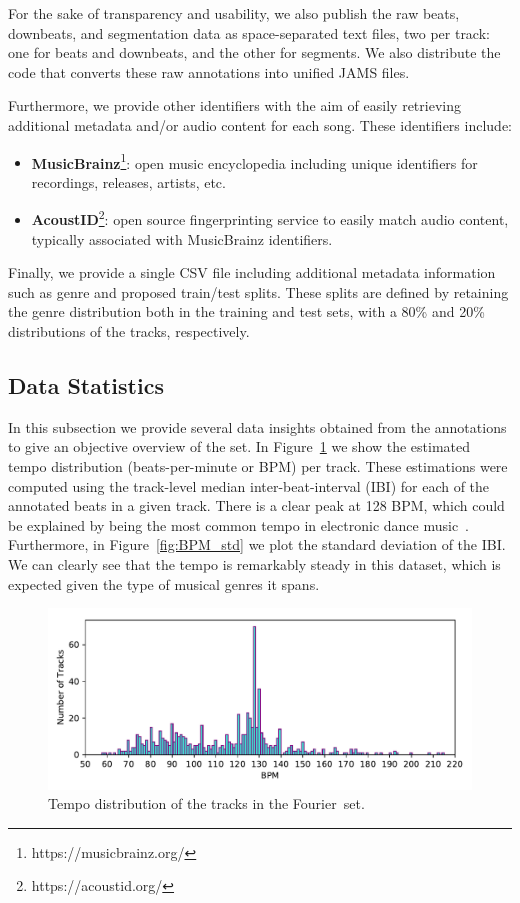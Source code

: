 \documentclass{article}
\newcommand{\setName}{Fourier}
\begin{document}
For the sake of transparency and usability, we also publish the raw beats, downbeats, and segmentation data as space-separated text files, two per track: one for beats and downbeats, and the other for segments.
We also distribute the code that converts these raw annotations into unified JAMS files.

Furthermore, we provide other identifiers with the aim of easily retrieving additional metadata and/or audio content for each song.
These identifiers include:

\begin{itemize}
    \item \textbf{MusicBrainz}\footnote{https://musicbrainz.org/}: open music encyclopedia including unique identifiers for recordings, releases, artists, etc. 
    \item \textbf{AcoustID}\footnote{https://acoustid.org/}: open source fingerprinting service to easily match audio content, typically associated with MusicBrainz identifiers.
\end{itemize}

Finally, we provide a single CSV file including additional metadata information such as genre and proposed train/test splits.
These splits are defined by retaining the genre distribution both in the training and test sets, with a 80\% and 20\% distributions of the tracks, respectively.

\subsection{Data Statistics}

In this subsection we provide several data insights obtained from the annotations to give an objective overview of the set.
In Figure~\ref{fig:BPM_dist} we show the estimated tempo distribution (beats-per-minute or BPM) per track.
These estimations were computed using the track-level median inter-beat-interval (IBI) for each of the annotated beats in a given track.
There is a clear peak at 128 BPM, which could be explained by being the most common tempo in electronic dance music~\cite{Moelants2008}.
Furthermore, in Figure~\ref{fig:BPM_std} we plot the standard deviation of the IBI.
We can clearly see that the tempo is remarkably steady in this dataset, which is expected given the type of musical genres it spans.

\begin{figure}
    \centerline{\includegraphics[width=1.05\columnwidth]{figs/BPM_distribution.pdf}}
    \caption{Tempo distribution of the tracks in the \setName~set.}
    \label{fig:BPM_dist}
\end{figure}
\end{document}
